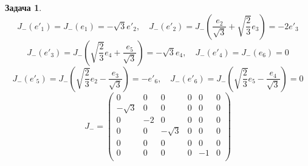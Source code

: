 \documentclass[12pt]{article}
\theoremstyle{definition}
\newtheorem{zad}{Задача}[section]
\begin{document}
\begin{zad}
    \begin{equation}
        J_-(e'_1)=J_-(e_1)=-\sqrt{3}e'_2,\quad J_-(e'_2)=J_-\left(\frac{e_2}{\sqrt{3}}+\sqrt{\frac{2}{3}}e_3\right)=-2e'_3
    \end{equation}
    \begin{equation}
        J_-(e'_3)=J_-\left(\sqrt{\frac{2}{3}}e_4+\frac{e_5}{\sqrt{3}}\right)=-\sqrt{3}e_4,\quad J_-(e'_4)=J_-(e_6)=0
    \end{equation}
    \begin{equation}
        J_-(e'_5)=J_-\left(\sqrt{\frac{2}{3}}e_2-\frac{e_3}{\sqrt{3}}\right)=-e'_6,\quad J_-(e'_6)=J_-\left(\sqrt{\frac{2}{3}}e_5-\frac{e_4}{\sqrt{3}}\right)=0
    \end{equation}
    \begin{equation}
        J_-=\left(
    \begin{array}{cccccc}
    0 & 0 & 0 & 0 & 0 & 0\\
    -\sqrt{3} & 0 & 0 & 0 & 0 & 0\\
    0 & -2 & 0 & 0 & 0 & 0\\
    0 & 0 & -\sqrt{3} & 0 & 0 & 0\\
    0 & 0 & 0 & 0 & 0 & 0\\
    0 & 0 & 0 & 0 & -1 & 0\\
    \end{array}
    \right)
    \end{equation}
    

\end{zad}
\end{document}
